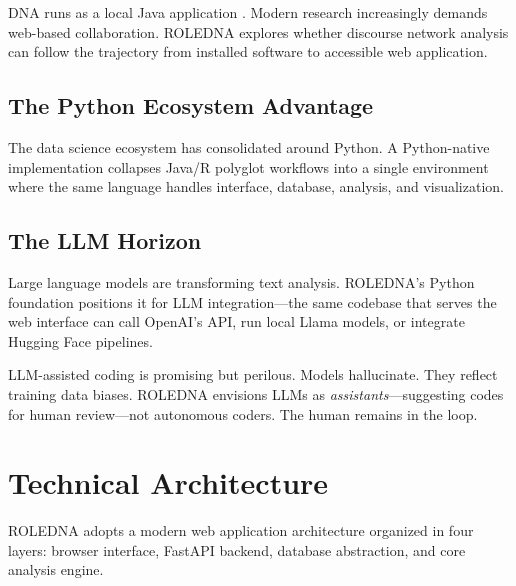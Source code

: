 \documentclass[../main.tex]{subfiles}
\begin{document}
DNA runs as a local Java application \cite{leifeld2013dna}. Modern research increasingly demands web-based collaboration. ROLEDNA explores whether discourse network analysis can follow the trajectory from installed software to accessible web application.

\subsection{The Python Ecosystem Advantage}

The data science ecosystem has consolidated around Python. A Python-native implementation collapses Java/R polyglot workflows into a single environment where the same language handles interface, database, analysis, and visualization.

\subsection{The LLM Horizon}

Large language models are transforming text analysis. ROLEDNA's Python foundation positions it for LLM integration---the same codebase that serves the web interface can call OpenAI's API, run local Llama models, or integrate Hugging Face pipelines.

\begin{criticalbox}
LLM-assisted coding is promising but perilous. Models hallucinate. They reflect training data biases. ROLEDNA envisions LLMs as \emph{assistants}---suggesting codes for human review---not autonomous coders. The human remains in the loop.
\end{criticalbox}


\section{Technical Architecture}

ROLEDNA adopts a modern web application architecture organized in four layers: browser interface, FastAPI backend, database abstraction, and core analysis engine.

\end{document}
